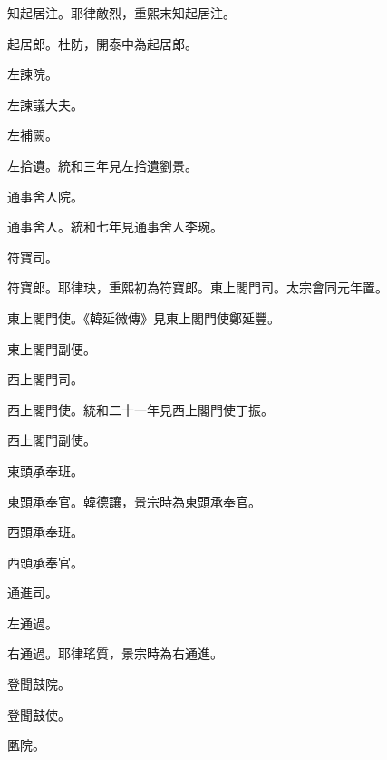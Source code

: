 \begin{pinyinscope}
 知起居注。耶律敵烈，重熙末知起居注。



 起居郎。杜防，開泰中為起居郎。



 左諫院。



 左諫議大夫。



 左補闕。



 左拾遺。統和三年見左拾遺劉景。



 通事舍人院。



 通事舍人。統和七年見通事舍人李琬。



 符寶司。



 符寶郎。耶律玦，重熙初為符寶郎。東上閣門司。太宗會同元年置。



 東上閣門使。《韓延徽傳》見東上閣門使鄭延豐。



 東上閣門副便。



 西上閣門司。



 西上閣門使。統和二十一年見西上閣門使丁振。



 西上閣門副使。



 東頭承奉班。



 東頭承奉官。韓德讓，景宗時為東頭承奉官。



 西頭承奉班。



 西頭承奉官。



 通進司。



 左通過。



 右通過。耶律瑤質，景宗時為右通進。



 登聞鼓院。



 登聞鼓使。



 匭院。




\end{pinyinscope}
